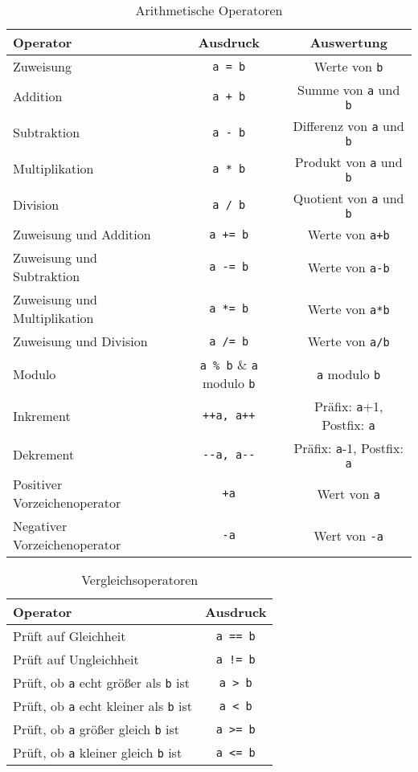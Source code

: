 \begin{table}
  \centering
  \begin{tabular}{l c c}
    \hline
    Operator & Ausdruck & Auswertung \\
    \hline
    Zuweisung & \verb|a = b| & Werte von \verb|b| \\
    Addition & \verb|a + b| & Summe von \verb|a| und \verb|b| \\
    Subtraktion & \verb|a - b| & Differenz von \verb|a| und \verb|b| \\
    Multiplikation & \verb|a * b| & Produkt von \verb|a| und \verb|b| \\
    Division & \verb|a / b| & Quotient von \verb|a| und \verb|b| \\
    Zuweisung und Addition & \verb|a += b| & Werte von \verb|a+b| \\
    Zuweisung und Subtraktion & \verb|a -= b| & Werte von \verb|a-b| \\
    Zuweisung und Multiplikation & \verb|a *= b| & Werte von \verb|a*b| \\
    Zuweisung und Division & \verb|a /= b| & Werte von \verb|a/b| \\
    Modulo & \verb|a % b| & \verb|a| modulo \verb|b| \\
    Inkrement & \verb|++a, a++| & Präfix: \verb|a|+1, Postfix: \verb|a| \\
    Dekrement & \verb|--a, a--| & Präfix: \verb|a|-1, Postfix: \verb|a| \\
    Positiver Vorzeichenoperator & \verb|+a| & Wert von \verb|a| \\
    Negativer Vorzeichenoperator & \verb|-a| & Wert von \verb|-a|  \\
    \hline
  \end{tabular}
  \caption{Arithmetische Operatoren \label{oper}}
\end{table}

\begin{table}
  \centering
  \begin{tabular}{l c}
    \hline
    Operator & Ausdruck \\
    \hline
    Prüft auf Gleichheit & \verb|a == b|  \\
    Prüft auf Ungleichheit & \verb|a != b| \\
    Prüft, ob \verb|a| echt größer als \verb|b| ist & \verb|a > b| \\
    Prüft, ob \verb|a| echt kleiner als \verb|b| ist & \verb|a < b| \\
    Prüft, ob \verb|a| größer gleich \verb|b| ist & \verb|a >= b| \\
    Prüft, ob \verb|a| kleiner gleich \verb|b| ist & \verb|a <= b| \\
    \hline
  \end{tabular}
  \caption{Vergleichsoperatoren \label{vergoper}}
\end{table}

